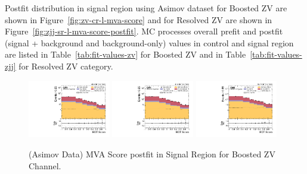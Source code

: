 Postfit distribution in signal region using Asimov dataset
for Boosted ZV are shown in Figure~\ref{fig:zv-cr-l-mva-score}
and for Resolved ZV are shown in Figure~\ref{fig:zjj-sr-l-mva-score-postfit}.
\gls{MC} processes overall prefit and postfit (signal + background and background-only)
values in control and signal region are listed in Table~\ref{tab:fit-values-zv}
for Boosted ZV and in Table~\ref{tab:fit-values-zjj} for Resolved ZV category.

\begin{figure}[!ht]
  \centering
  \includegraphics[width=0.32\textwidth]{analysis_plots/2016_zv.sr_l_postfit/sr_l_postfit/mva_score_zv_var2_log.pdf}
  \includegraphics[width=0.32\textwidth]{analysis_plots/2017_zv.sr_l_postfit/sr_l_postfit/mva_score_zv_var2_log.pdf}
  \includegraphics[width=0.32\textwidth]{analysis_plots/2018_zv.sr_l_postfit/sr_l_postfit/mva_score_zv_var2_log.pdf} \\
  \caption[MVA Score postfit in Signal Region for Boosted ZV Channel]%
  {(Asimov Data) MVA Score postfit in Signal Region for Boosted ZV Channel.}%
  \label{fig:zv-sr-l-mva-score-postfit}
\end{figure}

